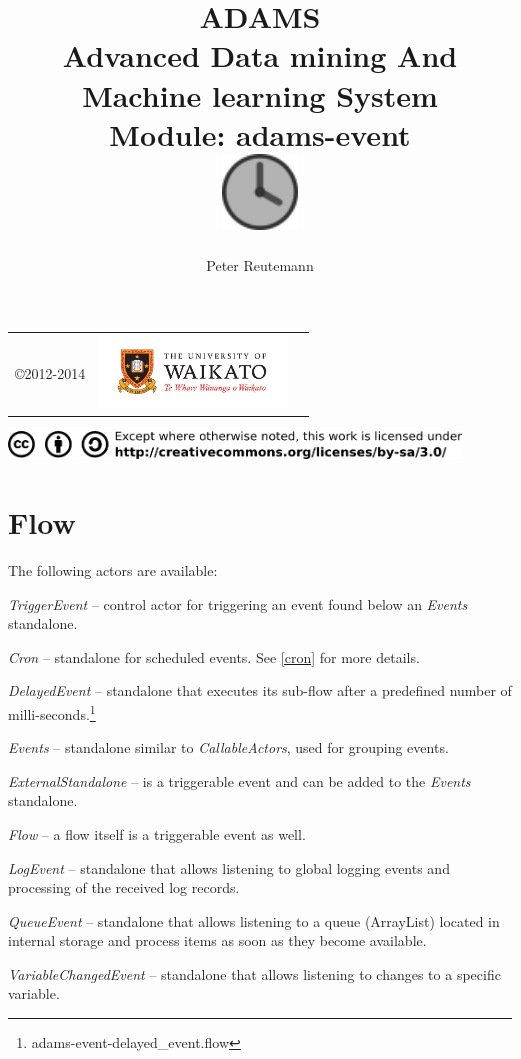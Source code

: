 \documentclass[a4paper]{book}
\title{
  \textbf{ADAMS} \\
  {\Large \textbf{A}dvanced \textbf{D}ata mining \textbf{A}nd \textbf{M}achine
  learning \textbf{S}ystem} \\
  {\Large Module: adams-event} \\
  \vspace{1cm}
  \includegraphics[width=2cm]{images/event-module.png} \\
}
\author{
  Peter Reutemann
}
\begin{document}
\begin{titlepage}
\maketitle

\thispagestyle{empty}
\center
\begin{table}[b]
	\begin{tabular}{c l l}
		\parbox[c][2cm]{2cm}{\copyright 2012-2014} &
		\parbox[c][2cm]{5cm}{\includegraphics[width=5cm]{images/coat_of_arms.pdf}} \\
	\end{tabular}
	\includegraphics[width=12cm]{images/cc.png} \\
\end{table}

\end{titlepage}

\tableofcontents
\listoffigures

\chapter{Flow}
The following actors are available:
\begin{tight_itemize}
	\item \textit{TriggerEvent} -- control actor for triggering an event found
	below an \textit{Events} standalone.
	\item \textit{Cron} -- standalone for scheduled events. See \ref{cron} for 
	more details.
	\item \textit{DelayedEvent} -- standalone that executes its sub-flow after
	a predefined number of milli-seconds.\footnote{adams-event-delayed\_event.flow}
	\item \textit{Events} -- standalone similar to \textit{CallableActors}, used
	for grouping events.
	\item \textit{ExternalStandalone} -- is a triggerable event and can be 
	added to the \textit{Events} standalone.
	\item \textit{Flow} -- a flow itself is a triggerable event as well.
	\item \textit{LogEvent} -- standalone that allows listening to global 
	logging events and processing of the received log records.
	\item \textit{QueueEvent} -- standalone that allows listening to a queue 
	(ArrayList) located in internal storage and process items as soon as they
	become available.
	\item \textit{VariableChangedEvent} -- standalone that allows listening to
	changes to a specific variable.
\end{tight_itemize}
\end{document}
